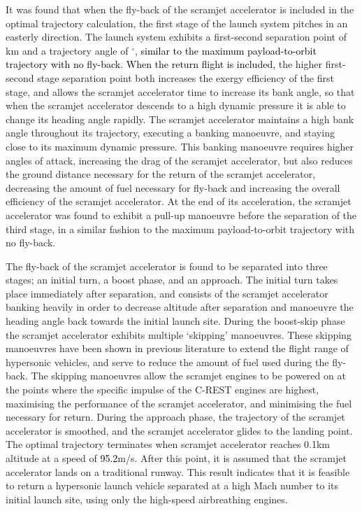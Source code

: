 It was found that when the fly-back of the scramjet accelerator is included in the optimal trajectory calculation, the first stage of the launch system pitches in an easterly direction. 
The launch system exhibits a first-second separation point of \firstsecondSeparationAltStandard km and a trajectory angle of \firstsecondSeparationgammaStandard $^\circ$, \textcolor{black}{similar to the maximum payload-to-orbit trajectory with no fly-back. 
When the return flight is included,} the higher first-second stage separation point both increases the exergy efficiency of the first stage, and allows the scramjet accelerator time to increase its bank angle, so that when the scramjet accelerator descends to a high dynamic pressure it is able to change its heading angle rapidly. The scramjet accelerator maintains a high bank angle throughout its trajectory, executing a banking manoeuvre, and staying close to its maximum dynamic pressure. 
This banking manoeuvre requires higher angles of attack, increasing the drag of the scramjet accelerator, but also reduces the ground distance necessary for the return of the scramjet accelerator, decreasing the amount of fuel necessary for fly-back and increasing the overall efficiency of the scramjet accelerator. 
At the end of its acceleration, the scramjet accelerator was found to exhibit a pull-up manoeuvre before the separation of the third stage, in a similar fashion to the maximum payload-to-orbit trajectory with no fly-back. 

The fly-back of the scramjet accelerator is found to be separated into three stages; an initial turn, a boost phase, and an approach. 
The initial turn takes place immediately after separation, and consists of the scramjet accelerator banking heavily in order to decrease altitude after separation and manoeuvre the heading angle back towards the initial launch site. 
During the boost-skip phase the scramjet accelerator exhibits multiple `skipping' manoeuvres. These skipping manoeuvres have been shown in previous literature to extend the flight range of hypersonic vehicles\cite{Moshman2014,Darby2011,Toso2015,Tetlow1992,Eggers1957,Kanda2007,Chai2015}, and serve to reduce the amount of fuel used during the fly-back.
The skipping manoeuvres allow the scramjet engines to be powered on at the points where the specific impulse of the C-REST engines are highest, maximising the performance of the scramjet accelerator, and minimising the fuel necessary for return. 
During the approach phase, the trajectory of the scramjet accelerator is smoothed, and the scramjet accelerator glides to the landing point. 
 The optimal trajectory terminates when scramjet accelerator reaches 0.1km altitude at a speed of \textcolor{black}{95.2}m/s. After this point, it is assumed that the scramjet accelerator lands on a traditional runway.  
This result indicates that it is feasible to return a hypersonic launch vehicle separated at a high Mach number to its initial launch site, using only the high-speed airbreathing engines.  


